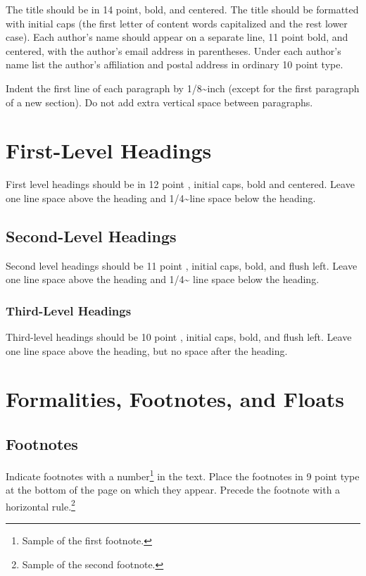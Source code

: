 \documentclass[11pt]{article}
\begin{document}
The title should be in 14 point, bold, and centered. The title should be
formatted with initial caps (the first letter of content words
capitalized and the rest lower case). Each author's name should appear
on a separate line, 11 point bold, and centered, with the author's email
address in parentheses. Under each author's name list the author's
affiliation and postal address in ordinary 10 point type.

Indent the first line of each paragraph by 1/8\textasciitilde{}inch
(except for the first paragraph of a new section). Do not add extra
vertical space between paragraphs.

\section{First-Level Headings}\label{first-level-headings}

First level headings should be in 12 point , initial caps, bold and
centered. Leave one line space above the heading and
1/4\textasciitilde{}line space below the heading.

\subsection{Second-Level Headings}\label{second-level-headings}

Second level headings should be 11 point , initial caps, bold, and flush
left. Leave one line space above the heading and 1/4\textasciitilde{}
line space below the heading.

\subsubsection{Third-Level Headings}\label{third-level-headings}

Third-level headings should be 10 point , initial caps, bold, and flush
left. Leave one line space above the heading, but no space after the
heading.

\section{Formalities, Footnotes, and
Floats}\label{formalities-footnotes-and-floats}

\subsection{Footnotes}\label{footnotes}

Indicate footnotes with a number\footnote{Sample of the first
footnote.} in the text. Place the footnotes in 9 point type at the
bottom of the page on which they appear. Precede the footnote with a
horizontal rule.\footnote{Sample of the second footnote.}
\end{document}
